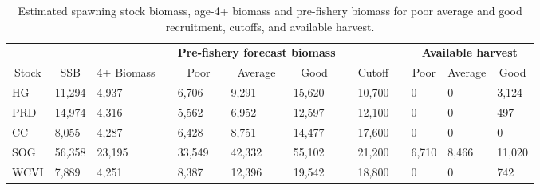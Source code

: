 %
\begin{table}[!tbp]
 \small
 \caption{Estimated spawning stock biomass,  age-4+ biomass and pre-fishery
			biomass for poor average and good recruitment,  cutoffs,  and 
			available harvest.\label{TableCatchAdvice}} 
 \begin{center}
 \begin{tabular}{lllclllclclll}\hline\hline
\multicolumn{3}{c}{\bfseries }&
\multicolumn{1}{c}{\bfseries }&
\multicolumn{3}{c}{\bfseries Pre-fishery forecast biomass}&
\multicolumn{1}{c}{\bfseries }&
\multicolumn{1}{c}{\bfseries }&
\multicolumn{1}{c}{\bfseries }&
\multicolumn{3}{c}{\bfseries Available harvest}
\tabularnewline \cline{1-13}
\multicolumn{1}{c}{Stock}&\multicolumn{1}{c}{SSB}&\multicolumn{1}{c}{4+ Biomass}&\multicolumn{1}{c}{}&\multicolumn{1}{c}{Poor}&\multicolumn{1}{c}{Average}&\multicolumn{1}{c}{Good}&\multicolumn{1}{c}{}&\multicolumn{1}{c}{Cutoff}&\multicolumn{1}{c}{}&\multicolumn{1}{c}{Poor}&\multicolumn{1}{c}{Average}&\multicolumn{1}{c}{Good}\tabularnewline
\hline
HG&11,294& 4,937&& 6,706& 9,291&15,620&&10,700&&     0&     0& 3,124\tabularnewline
PRD&14,974& 4,316&& 5,562& 6,952&12,597&&12,100&&     0&     0&   497\tabularnewline
CC& 8,055& 4,287&& 6,428& 8,751&14,477&&17,600&&     0&     0&     0\tabularnewline
SOG&56,358&23,195&&33,549&42,332&55,102&&21,200&& 6,710& 8,466&11,020\tabularnewline
WCVI& 7,889& 4,251&& 8,387&12,396&19,542&&18,800&&     0&     0&   742\tabularnewline
\hline
\end{tabular}

\end{center}

\end{table}

